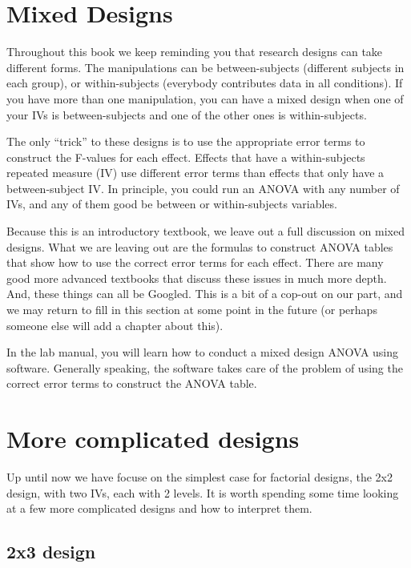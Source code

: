 \documentclass[]{book}
\begin{document}
\hypertarget{mixed-designs}{%
\section{Mixed Designs}\label{mixed-designs}}

Throughout this book we keep reminding you that research designs can take different forms. The manipulations can be between-subjects (different subjects in each group), or within-subjects (everybody contributes data in all conditions). If you have more than one manipulation, you can have a mixed design when one of your IVs is between-subjects and one of the other ones is within-subjects.

The only ``trick'' to these designs is to use the appropriate error terms to construct the F-values for each effect. Effects that have a within-subjects repeated measure (IV) use different error terms than effects that only have a between-subject IV. In principle, you could run an ANOVA with any number of IVs, and any of them good be between or within-subjects variables.

Because this is an introductory textbook, we leave out a full discussion on mixed designs. What we are leaving out are the formulas to construct ANOVA tables that show how to use the correct error terms for each effect. There are many good more advanced textbooks that discuss these issues in much more depth. And, these things can all be Googled. This is a bit of a cop-out on our part, and we may return to fill in this section at some point in the future (or perhaps someone else will add a chapter about this).

In the lab manual, you will learn how to conduct a mixed design ANOVA using software. Generally speaking, the software takes care of the problem of using the correct error terms to construct the ANOVA table.

\hypertarget{more-complicated-designs}{%
\section{More complicated designs}\label{more-complicated-designs}}

Up until now we have focuse on the simplest case for factorial designs, the 2x2 design, with two IVs, each with 2 levels. It is worth spending some time looking at a few more complicated designs and how to interpret them.

\hypertarget{x3-design}{%
\subsection{2x3 design}\label{x3-design}}
\end{document}
